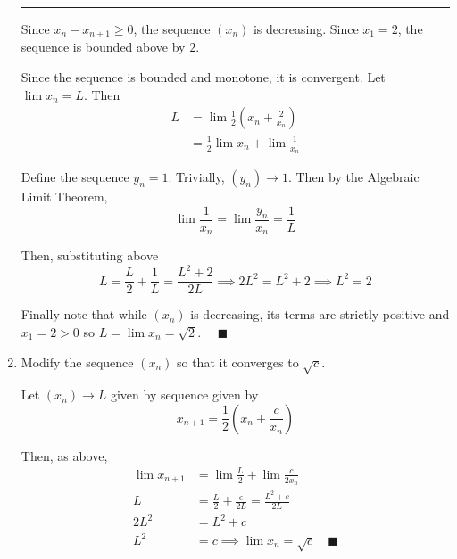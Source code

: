 \documentclass[12pt]{article}
\newcommand{\qed}{\quad \blacksquare}
\begin{document}
\begin{enumerate}
            \vspace*{10pt}
            \hrule 
            \vspace*{10pt}

            Since $x_n - x_{n+1} \geq 0$, the sequence $(x_n)$ is decreasing. Since $x_1 = 2$, the sequence is bounded above by $2$.

            Since the sequence is bounded and monotone, it is convergent. Let $\lim x_n = L$. Then
            \begin{align*}
                L &= \lim \frac{1}{2}\left(x_n + \frac{2}{x_n}\right)\\ 
                &= \frac{1}{2}\lim x_n + \lim \frac{1}{x_n}
            \end{align*}
            
            Define the sequence $y_n = 1$. Trivially, $(y_n) \to 1$. Then by the Algebraic Limit Theorem,
            \[\lim \frac{1}{x_n} = \lim \frac{y_n}{x_n} = \frac{1}{L}\]

            Then, substituting above 
            \[L = \frac{L}{2} + \frac{1}{L} = \frac{L^2 + 2}{2L} \implies 2L^2 = L^2 + 2 \implies L^2 = 2\]

            Finally note that while $(x_n)$ is decreasing, its terms are strictly positive and $x_1 = 2 > 0$ so $L = \lim x_n = \sqrt{2}$. $\qed$
        \color{black}

	\item Modify the sequence $(x_n)$ so that it converges to $\sqrt{c}$.
	
        \color{blue}
            Let $(x_n) \to L$ given by sequence given by
            \[x_{n+1} = \frac{1}{2}\left(x_n + \frac{c}{x_n}\right)\]

            Then, as above, 
            \begin{align*}
                \lim x_{n+1} &= \lim \frac{L}{2} + \lim \frac{c}{2x_n}\\ 
                L &= \frac{L}{2} + \frac{c}{2L} = \frac{L^2 + c}{2L}\\ 
                2L^2 &= L^2 + c\\
                L^2 &= c \implies \lim x_n = \sqrt{c} \qed
            \end{align*}
        \color{black}
\end{enumerate}

\pagebreak
\end{document}
